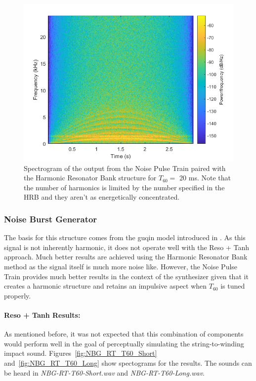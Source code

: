 \documentclass[../main.tex]{subfiles}
\begin{document}
\begin{figure}[h]
    \centering
    \includegraphics[scale=.65]{./images/plots/NPTHRBT60Long.png}
    \caption{Spectrogram of the output from the Noise Pulse Train paired with the Harmonic Resonator Bank structure for $T_{60} = $ 20 ms. Note that the number of harmonics is limited by the number specified in the HRB and they aren't as energetically concentrated.}
    \label{fig:NPT_HRB_T60_Long}
\end{figure}


\subsubsection{Noise Burst Generator}
The basis for this structure comes from the guqin model introduced in . As this signal is not inherently harmonic, it does not operate well with the Reso + Tanh approach. Much better results are achieved using the Harmonic Resonator Bank method as the signal itself is much more noise like. However, the Noise Pulse Train provides much better results in the context of the synthesizer given that it creates a harmonic structure and retains an impulsive aspect when $T_{60}$ is tuned properly.

\paragraph{Reso + Tanh Results:}
As mentioned before, it was not expected that this combination of components would perform well in the goal of perceptually simulating the string-to-winding impact sound. Figures~\ref{fig:NBG_RT_T60_Short} and~\ref{fig:NBG_RT_T60_Long} show spectograms for the results. The sounds can be heard in \emph{NBG-RT-T60-Short.wav} and \emph{NBG-RT-T60-Long.wav}.
\end{document}

